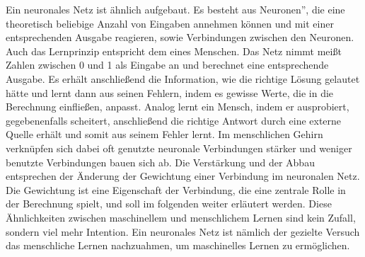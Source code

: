 \documentclass[11pt]{article}
\begin{document}
Ein neuronales Netz ist ähnlich aufgebaut. Es besteht aus \glqq Neuronen'', die eine theoretisch beliebige Anzahl von Eingaben annehmen können und mit einer entsprechenden Ausgabe reagieren, sowie Verbindungen zwischen den Neuronen. Auch das Lernprinzip entspricht dem eines Menschen. Das Netz nimmt meißt Zahlen zwischen 0 und 1 als Eingabe an und berechnet eine entsprechende Ausgabe. Es erhält anschließend die Information, wie die richtige Lösung gelautet hätte und lernt dann aus seinen Fehlern, indem es gewisse Werte, die in die Berechnung einfließen, anpasst. Analog lernt ein Mensch, indem er ausprobiert, gegebenenfalls scheitert, anschließend die richtige Antwort durch eine externe Quelle erhält und somit aus seinem Fehler lernt. Im menschlichen Gehirn verknüpfen sich dabei oft genutzte neuronale Verbindungen stärker und weniger benutzte Verbindungen bauen sich ab\cite{2}. Die Verstärkung und der Abbau entsprechen der Änderung der Gewichtung einer Verbindung im neuronalen Netz. Die Gewichtung ist eine Eigenschaft der Verbindung, die eine zentrale Rolle in der Berechnung spielt, und soll im folgenden weiter erläutert werden. Diese Ähnlichkeiten zwischen maschinellem und menschlichem Lernen sind kein Zufall, sondern viel mehr Intention. Ein neuronales Netz ist nämlich der gezielte Versuch das menschliche Lernen nachzuahmen, um maschinelles Lernen zu ermöglichen.
\end{document}
